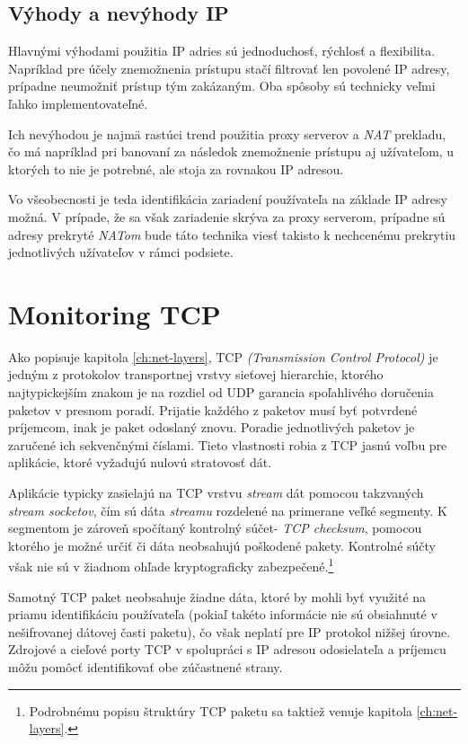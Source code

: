 \documentclass[
  digital, %
  table,   %
  lof,     %
  nolot,   %
  nocover
]{fithesis3}
\begin{document}
\subsection{Výhody a nevýhody IP}
Hlavnými výhodami použitia IP adries sú jednoduchosť, rýchlosť a flexibilita.
Napríklad pre účely znemožnenia prístupu stačí filtrovať len povolené IP
adresy, prípadne neumožniť prístup tým zakázaným. Oba spôsoby sú technicky veľmi
ľahko implementovateľné.

Ich nevýhodou je najmä rastúci trend použitia proxy serverov a \textit{NAT}
prekladu, čo má napríklad pri banovaní za následok znemožnenie prístupu aj
užívateľom, u ktorých to nie je potrebné, ale stoja za rovnakou IP adresou.

Vo všeobecnosti je teda identifikácia zariadení používateľa na základe IP
adresy možná. V prípade, že sa však zariadenie skrýva za proxy serverom,
prípadne sú adresy prekryté \textit{NATom} bude táto technika viesť takisto k
nechcenému prekrytiu jednotlivých užívateľov v rámci podsiete.

\section{Monitoring TCP}
Ako popisuje kapitola \ref{ch:net-layers}, TCP
\textit{(Transmission Control Protocol)} je jedným z protokolov transportnej
vrstvy sieťovej hierarchie, ktorého najtypickejším znakom je na rozdiel
od UDP garancia spoľahlivého doručenia paketov v presnom poradí. Prijatie
každého z paketov musí byť potvrdené príjemcom, inak je paket odoslaný znovu.
Poradie jednotlivých paketov je zaručené ich sekvenčnými číslami. Tieto 
vlastnosti robia z TCP jasnú voľbu pre aplikácie, ktoré vyžadujú nulovú
stratovosť dát. 

Aplikácie typicky zasielajú na TCP vrstvu \textit{stream} dát
pomocou takzvaných \textit{stream socketov}, čím sú dáta \textit{streamu}
rozdelené na primerane veľké segmenty. K segmentom je zároveň spočítaný
kontrolný súčet- \textit{TCP checksum}, pomocou ktorého je možné určiť či
dáta neobsahujú poškodené pakety. Kontrolné súčty však nie sú v žiadnom ohľade
kryptograficky zabezpečené.\footnote{Podrobnému popisu štruktúry TCP paketu sa
taktiež venuje kapitola \ref{ch:net-layers}.}

Samotný TCP paket neobsahuje žiadne dáta, ktoré by mohli byť využité na priamu
identifikáciu používateľa (pokiaľ takéto informácie nie sú obsiahnuté v
nešifrovanej dátovej časti paketu), čo však neplatí pre IP protokol nižšej
úrovne. Zdrojové a cieľové porty TCP v spolupráci s IP adresou odosielateľa a
príjemcu môžu pomôcť identifikovať obe zúčastnené strany.
\end{document}
